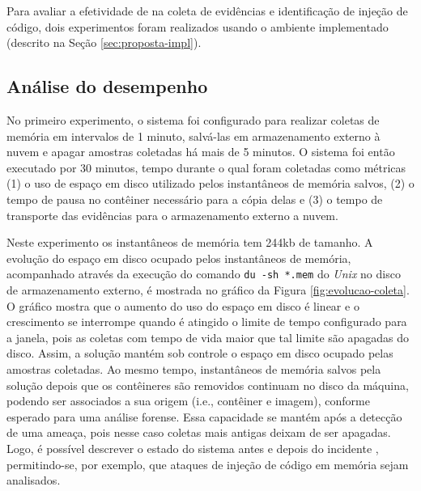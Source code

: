 Para avaliar a efetividade de \fancyname na coleta de evidências e identificação de injeção de código, dois experimentos foram realizados usando o ambiente implementado (descrito na Seção \ref{sec:proposta-impl}).
%


\subsection{Análise do desempenho}
\label{sec:proposta-exp-desempenho}

No primeiro experimento, o sistema foi configurado para realizar coletas de memória em intervalos de 1 minuto, salvá-las em armazenamento externo à nuvem e apagar amostras coletadas há mais de 5 minutos. 
%
O sistema foi então executado por 30 minutos, tempo durante o qual foram coletadas como métricas (1) o uso de espaço em disco utilizado pelos instantâneos de memória salvos, (2) o tempo de pausa no contêiner necessário para a cópia delas e (3) o tempo de transporte das evidências para o armazenamento externo a nuvem.


Neste experimento os instantâneos de memória tem 244kb de tamanho. A evolução do espaço em disco ocupado pelos instantâneos de memória, acompanhado através da execução do comando \texttt{du -sh *.mem} do \textit{Unix} no disco de armazenamento externo, é mostrada no gráfico da Figura \ref{fig:evolucao-coleta}.
%
O gráfico mostra que o aumento do uso do espaço em disco é linear e o crescimento se interrompe quando é atingido o limite de tempo configurado para a janela, pois as coletas com tempo de vida maior que tal limite são apagadas do disco. 
%
Assim, a solução mantém sob controle o espaço em disco ocupado pelas amostras coletadas.
%
Ao mesmo tempo, instantâneos de memória salvos pela solução depois que os contêineres são removidos continuam no disco da máquina, podendo ser associados a sua origem (i.e., contêiner e imagem), conforme esperado para uma análise forense.
%
Essa capacidade se mantém após a detecção de uma ameaça, pois nesse caso coletas mais antigas deixam de ser apagadas.
%
Logo, é possível descrever o estado do sistema antes e depois do incidente \cite{CaseMemoryForensics:2014}, permitindo-se, por exemplo, que ataques de injeção de código em memória sejam analisados.



